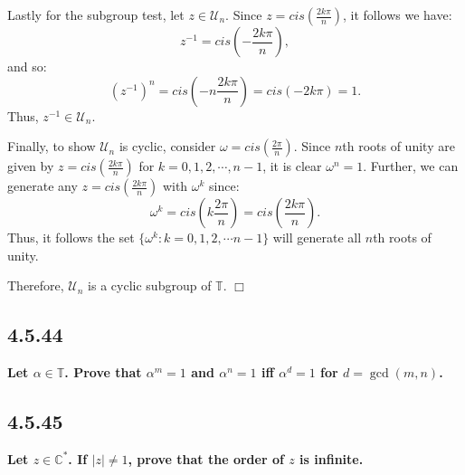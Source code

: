 \documentclass[11pt, a4paper]{article}
\begin{document}
Lastly for the subgroup test, let $z \in \mathcal{U}_{n}$. Since $z = cis \left ( \frac{2k\pi}{n} \right )$, it follows we have:
\[
  z^{-1} = cis \left (- \frac{2k\pi}{n} \right ),
\]
and so:
\[
  (z^{-1})^n = cis \left (-n \frac{2k\pi}{n} \right ) = cis(-2k\pi) = 1.
\]
Thus, $z^{-1} \in \mathcal{U}_{n}$.

Finally, to show $\mathcal{U}_{n}$ is cyclic, consider $\omega = cis \left ( \frac{2\pi}{n} \right )$. Since $n$th roots of unity are given by $z = cis \left ( \frac{2k\pi}{n} \right )$ for $k = 0, 1, 2, \cdots, n - 1$, it is clear $\omega^n = 1$. Further, we can generate any $z = cis \left ( \frac{2k\pi}{n} \right )$ with $\omega^k$ since:
\[
  \omega^k = cis \left (k \frac{2\pi}{n} \right ) = cis \left ( \frac{2k\pi}{n} \right ).
\]
Thus, it follows the set $\{\omega^k : k = 0, 1, 2, \cdots n - 1\}$ will generate all $n$th roots of unity.

Therefore, $\mathcal{U}_{n}$ is a cyclic subgroup of $\mathbb{T}$. $\Box$

\newpage

\subsection{4.5.44}
\textbf{Let $\alpha \in \mathbb{T}$. Prove that $\alpha^m = 1$ and $\alpha^n = 1$ iff $\alpha^d = 1$ for $d = \gcd(m, n)$.}

\subsection{4.5.45}
\textbf{Let $z \in \mathbb{C}^{*}$. If $|z| \neq 1$, prove that the order of $z$ is infinite.}
\end{document}

